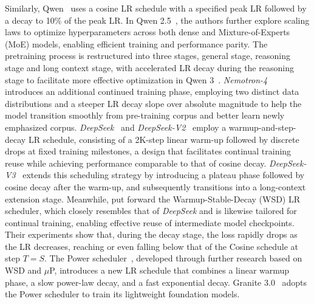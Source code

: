 Similarly, Qwen~\cite{bai2023qwen} uses a cosine LR schedule with a specified peak LR followed by a decay to 10\% of the peak LR. In Qwen 2.5~\cite{qwen2025qwen25technicalreport}, the authors further explore scaling laws to optimize hyperparameters across both dense and Mixture-of-Experts (MoE) models, enabling efficient training and performance parity. The pretraining process is restructured into three stages, general stage, reasoning stage and long context stage, with accelerated LR decay during the reasoning stage to facilitate more effective optimization in Qwen 3~\cite{yang2025qwen3}.
\textit{Nemotron-4}~\cite{parmar2024nemotron, adler2024nemotron} introduces an additional continued training phase, employing two distinct data distributions and a steeper LR decay slope over absolute magnitude to help the model transition smoothly from pre-training corpus and better learn newly emphasized corpus.
\textit{DeepSeek}~\cite{bi2024deepseek} and \textit{DeepSeek-V2}~\cite{liu2024deepseek} employ a warmup-and-step-decay LR schedule, consisting of a 2K-step linear warm-up followed by discrete drops at fixed training milestones, a design that facilitates continual training reuse while achieving performance comparable to that of cosine decay. \textit{DeepSeek-V3}~\cite{liu2024deepseekv3} extends this scheduling strategy by introducing a plateau phase followed by cosine decay after the warm-up, and subsequently transitions into a long-context extension stage.
Meanwhile, \cite{hu2024minicpm} put forward the Warmup-Stable-Decay (WSD) LR scheduler, which closely resembles that of \textit{DeepSeek} and is likewise tailored for continual training, enabling effective reuse of intermediate model checkpoints. Their experiments show that, during the decay stage, the loss rapidly drops as the LR decreases, reaching or even falling below that of the Cosine schedule at step $T = S$. 
The Power scheduler~\cite{shen2024power}, developed through further research based on WSD and $\mu$P, introduces a new LR schedule that combines a linear warmup phase, a slow power-law decay, and a fast exponential decay. Granite 3.0~\cite{granite2024granite} adopts the Power scheduler to train its lightweight foundation models. %

